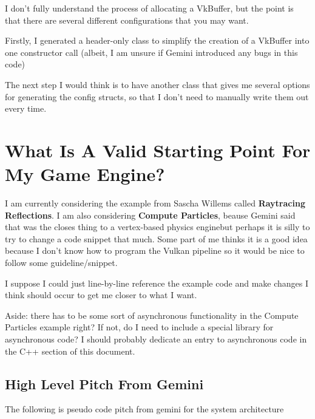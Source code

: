 \documentclass{article}
\begin{document}
\par I don't fully understand the process of allocating a VkBuffer,
but the point is that there are several different configurations that
you may want.

\par Firstly, I generated a header-only class to simplify the
creation of a VkBuffer into one constructor call (albeit, I am unsure
if Gemini introduced any bugs in this code)

\par The next step I would think is to have another class that gives
me several options for generating the config structs, so that I don't
need to manually write them out every time.

\section*{What Is A Valid Starting Point For My Game Engine?}

\par I am currently considering the example from Sascha Willems
called \textbf{Raytracing Reflections}. I am also considering
\textbf{Compute Particles}, beause Gemini said that was the closes
thing to a vertex-based physics engine\textemdash but perhaps it is
silly to try to change a code snippet that much. Some part of me
thinks it is a good idea because I don't know how to program the
Vulkan pipeline so it would be nice to follow some guideline/snippet.

\par I suppose I could just line-by-line reference the example code
and make changes I think should occur to get me closer to what I want.

\par Aside: there has to be some sort of asynchronous functionality
in the Compute Particles example right? If not, do I need to include
a special library for asynchronous code? I should probably dedicate
an entry to asynchronous code in the C++ section of this document.

\subsection*{High Level Pitch From
Gemini}
\par The following is pseudo code pitch from gemini for the system architecture
\end{document}
